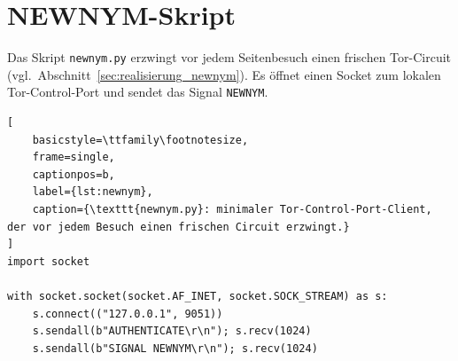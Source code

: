 \section{NEWNYM-Skript}
\label{app:listing_newnym}

Das Skript \texttt{newnym.py} erzwingt vor jedem Seitenbesuch einen frischen Tor-Circuit (vgl.\ Abschnitt~\ref{sec:realisierung_newnym}).
Es öffnet einen Socket zum lokalen Tor-Control-Port und sendet das Signal \texttt{NEWNYM}.

\begin{lstlisting}[
    basicstyle=\ttfamily\footnotesize,
    frame=single,
    captionpos=b,
    label={lst:newnym},
    caption={\texttt{newnym.py}: minimaler Tor-Control-Port-Client, der vor jedem Besuch einen frischen Circuit erzwingt.}
]
import socket

with socket.socket(socket.AF_INET, socket.SOCK_STREAM) as s:
    s.connect(("127.0.0.1", 9051))
    s.sendall(b"AUTHENTICATE\r\n"); s.recv(1024)
    s.sendall(b"SIGNAL NEWNYM\r\n"); s.recv(1024)
\end{lstlisting}
